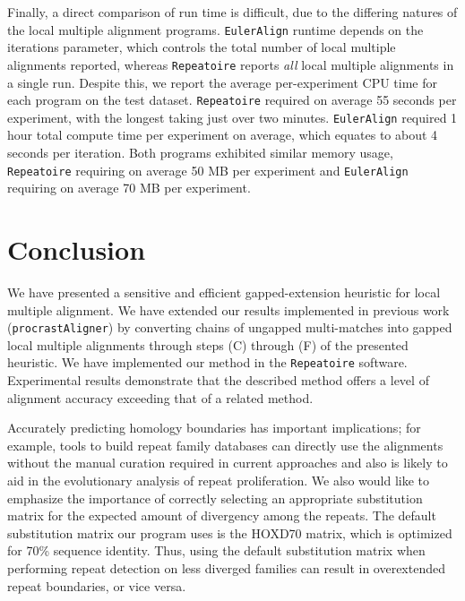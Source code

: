 \documentclass[9.5pt,journal,final,finalsubmission,twocolumn]{IEEEtran}
\begin{document}


Finally, a direct comparison of run time is difficult, due to the differing natures of the local multiple alignment programs.  \texttt{EulerAlign} runtime depends on the iterations parameter, which controls the total number of local multiple alignments reported, whereas \texttt{Repeatoire} reports \textit{all} local multiple alignments in a single run.  Despite this, we report the average per-experiment CPU time for each program on the test dataset. \texttt{Repeatoire} required on average 55 seconds per experiment, with the longest taking just over two minutes. \texttt{EulerAlign} required 1 hour total compute time per experiment on average, which equates to about 4 seconds per iteration.  Both programs exhibited similar memory usage, \texttt{Repeatoire} requiring on average 50 MB per experiment and \texttt{EulerAlign} requiring on average 70 MB per experiment.


\section{Conclusion}
We have presented a sensitive and efficient gapped-extension heuristic for local
multiple alignment. We have extended our results implemented in previous work (\texttt{procrastAligner}) by
converting chains of ungapped multi-matches into gapped local multiple
alignments through steps (C) through (F) of the presented heuristic. We have implemented our method in the \texttt{Repeatoire} software. Experimental results demonstrate that the
described method offers a level of alignment accuracy exceeding
that of a related method.

Accurately predicting homology boundaries has important implications; for example, tools to build repeat family databases can directly use the alignments without the manual curation required in current approaches and also is likely to aid in the evolutionary analysis of repeat proliferation.  We also would like to emphasize the importance of correctly selecting an appropriate substitution matrix for the expected amount of divergency among the repeats. The default substitution matrix our program uses is the HOXD70 matrix, which is optimized for 70\% sequence identity. Thus, using the default substitution matrix when performing repeat detection on less diverged families can result in overextended repeat boundaries, or vice versa.
\end{document}
